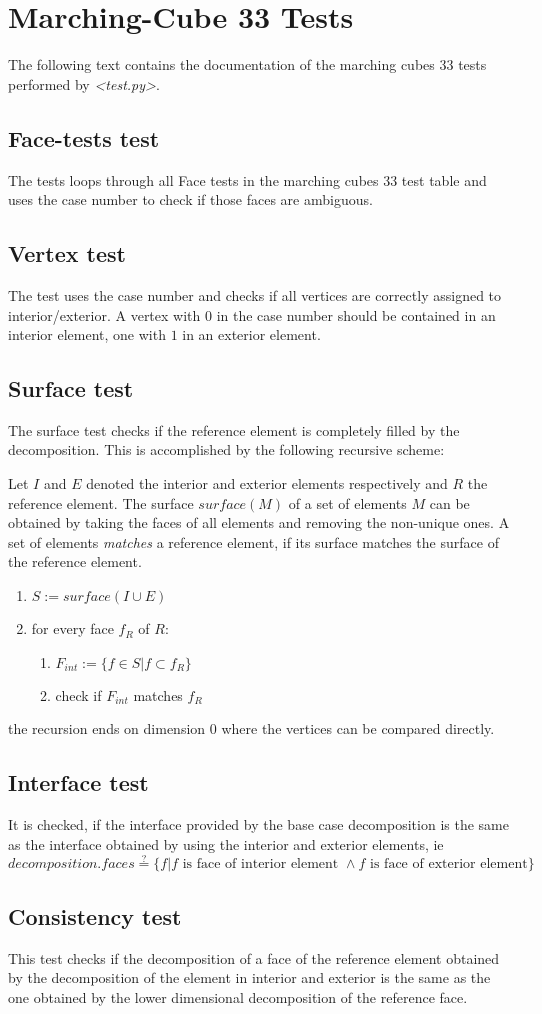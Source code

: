 \documentclass[a4paper, 11pt]{scrartcl}
\newcommand{\file}[1]{\emph{\textless #1\textgreater}}
\begin{document}
\section*{Marching-Cube 33 Tests}

The following text contains the documentation of the marching cubes 33 tests performed by \file{test.py}.
\subsection*{Face-tests test}
The tests loops through all Face tests in the marching cubes 33 test table and uses the case number to check if those faces are ambiguous.
\subsection*{Vertex test}
The test uses the case number and checks if all vertices are correctly assigned to interior/exterior. A vertex with $0$ in the case number should be contained in an interior element, one with $1$ in an exterior element.
\subsection*{Surface test}
The surface test checks if the reference element is completely filled by the decomposition. This is accomplished by the following recursive scheme:

Let $I$ and $E$ denoted the interior and exterior elements respectively and $R$ the reference element. The surface $surface(M)$ of a set of elements $M$ can be obtained by taking the faces of all elements and removing the non-unique ones. A set of elements \emph{matches} a reference element, if its surface matches the surface of the reference element.
\begin{enumerate}
\item $S:=surface(I\cup E)$
\item for every face $f_R$ of $R$:
  \begin{enumerate}
  \item $F_{int}:=\lbrace f \in S | f\subset f_R\rbrace$
  \item check if $F_{int}$ matches $f_R$
  \end{enumerate}
\end{enumerate}
the recursion ends on dimension $0$ where the vertices can be compared directly.
\subsection*{Interface test}
It is checked, if the interface provided by the base case decomposition is the same as the interface obtained by using the interior and exterior elements, ie \\
$decomposition.faces \stackrel{?}{=} \lbrace f | f\text{ is face of interior element }\wedge f\text{ is face of exterior element}\rbrace$
\subsection*{Consistency test}
This test checks if the decomposition of a face of the reference element obtained by the decomposition of the element in interior and exterior is the same as the one obtained by the lower dimensional decomposition of the reference face.
\end{document}
